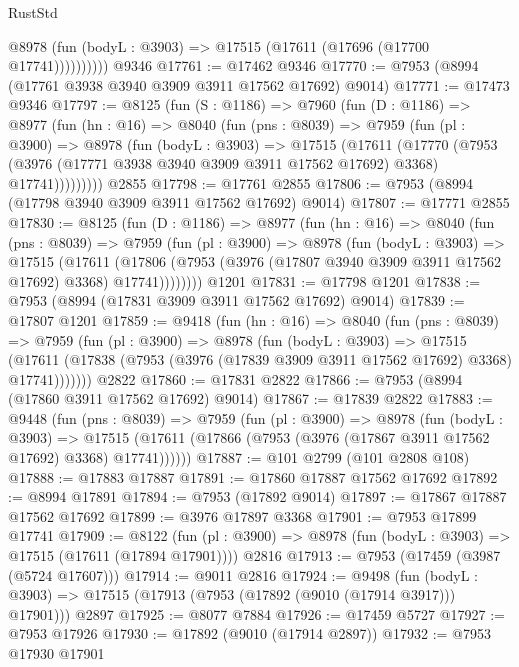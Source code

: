 \begin{lexlean}{RustStd}
\begin{coremodule}
              @8978 (fun (bodyL : @3903) => @17515 (@17611 (@17696 (@17700 @17741))))))))))
    @9346
@17761 := @17462 @9346
@17770 := @7953 (@8994 (@17761 @3938 @3940 @3909 @3911 @17562 @17692) @9014)
@17771 := @17473 @9346
@17797 := @8125
    (fun (S : @1186) =>
    @7960
      (fun (D : @1186) =>
      @8977
        (fun (hn : @16) =>
        @8040
          (fun (pns : @8039) =>
          @7959
            (fun (pl : @3900) =>
            @8978
              (fun (bodyL : @3903) =>
              @17515
                (@17611
                  (@17770
                    (@7953
                      (@3976 (@17771 @3938 @3940 @3909 @3911 @17562 @17692) @3368)
                      @17741)))))))))
    @2855
@17798 := @17761 @2855
@17806 := @7953 (@8994 (@17798 @3940 @3909 @3911 @17562 @17692) @9014)
@17807 := @17771 @2855
@17830 := @8125
    (fun (D : @1186) =>
    @8977
      (fun (hn : @16) =>
      @8040
        (fun (pns : @8039) =>
        @7959
          (fun (pl : @3900) =>
          @8978
            (fun (bodyL : @3903) =>
            @17515
              (@17611
                (@17806 (@7953 (@3976 (@17807 @3940 @3909 @3911 @17562 @17692) @3368) @17741))))))))
    @1201
@17831 := @17798 @1201
@17838 := @7953 (@8994 (@17831 @3909 @3911 @17562 @17692) @9014)
@17839 := @17807 @1201
@17859 := @9418
    (fun (hn : @16) =>
    @8040
      (fun (pns : @8039) =>
      @7959
        (fun (pl : @3900) =>
        @8978
          (fun (bodyL : @3903) =>
          @17515
            (@17611 (@17838 (@7953 (@3976 (@17839 @3909 @3911 @17562 @17692) @3368) @17741)))))))
    @2822
@17860 := @17831 @2822
@17866 := @7953 (@8994 (@17860 @3911 @17562 @17692) @9014)
@17867 := @17839 @2822
@17883 := @9448
    (fun (pns : @8039) =>
    @7959
      (fun (pl : @3900) =>
      @8978
        (fun (bodyL : @3903) =>
        @17515 (@17611 (@17866 (@7953 (@3976 (@17867 @3911 @17562 @17692) @3368) @17741))))))
@17887 := @101 @2799 (@101 @2808 @108)
@17888 := @17883 @17887
@17891 := @17860 @17887 @17562 @17692
@17892 := @8994 @17891
@17894 := @7953 (@17892 @9014)
@17897 := @17867 @17887 @17562 @17692
@17899 := @3976 @17897 @3368
@17901 := @7953 @17899 @17741
@17909 := @8122
    (fun (pl : @3900) => @8978 (fun (bodyL : @3903) => @17515 (@17611 (@17894 @17901))))
    @2816
@17913 := @7953 (@17459 (@3987 (@5724 @17607)))
@17914 := @9011 @2816
@17924 := @9498
    (fun (bodyL : @3903) => @17515 (@17913 (@7953 (@17892 (@9010 (@17914 @3917))) @17901)))
    @2897
@17925 := @8077 @7884
@17926 := @17459 @5727
@17927 := @7953 @17926
@17930 := @17892 (@9010 (@17914 @2897))
@17932 := @7953 @17930 @17901

\end{coremodule}
\end{lexlean}

